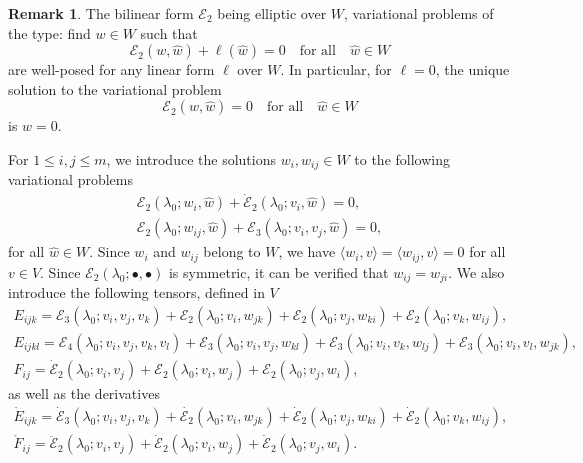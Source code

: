 \documentclass[12pt, final]{scrartcl}
\theoremstyle{definition}
\newtheorem{remark}{Remark}
\newcommand{\E}{\mathcal E}
\begin{document}
\begin{remark}
  \label{rem:20220902095055}
  The bilinear form $\E_2$ being elliptic over $W$, variational problems of the
  type: find $w \in W$ such that
  \begin{equation}
    \E_2(w, \hat{w})+\ell(\hat{w}) = 0 \quad \text{for all} \quad \hat{w} \in W
  \end{equation}
  are well-posed for any linear form $\ell$ over $W$. In particular, for
  $\ell=0$, the unique solution to the variational problem
  \begin{equation}
    \E_2(w, \hat{w}) = 0 \quad \text{for all} \quad \hat{w} \in W
  \end{equation}
  is $w = 0$.
\end{remark}

For $1 \leq i, j \leq m$, we introduce the solutions $w_i, w_{ij} \in W$ to the
following variational problems
\begin{gather}
  \label{eq:20220524134525}
  \E_2(\lambda_0; w_i, \hat{w}) + \dot{\E}_2(\lambda_0; v_i, \hat{w}) = 0,\\
  \label{eq:20220519164523}
  \E_2(\lambda_0; w_{i j}, \hat{w})+\E_3(\lambda_0; v_i, v_j, \hat{w}) = 0,
\end{gather}
for all $\hat{w} \in W$. Since $w_{i}$ and $w_{ij}$ belong to $W$, we have
$\langle w_{i}, v \rangle = \langle w_{ij}, v \rangle = 0$ for all $v \in V$. Since $\E_2(\lambda_0; \bullet,
\bullet)$ is symmetric, it can be verified that $w_{ij}=w_{ji}$. We also introduce
the following tensors, defined in $V$
\begin{gather}
  E_{ijk} = \E_3(\lambda_0; v_i, v_j, v_k) + \E_2(\lambda_0; v_i, w_{jk}) + \E_2(\lambda_0; v_j, w_{ki}) + \E_2(\lambda_0; v_k, w_{ij}),\\
  E_{ijkl} = \E_4(\lambda_0 ; v_i, v_j, v_k, v_l) + \E_3(\lambda_0 ; v_i, v_j, w_{kl}) + \E_3(\lambda_0 ; v_i, v_k, w_{lj}) + \E_3(\lambda_0 ; v_i, v_l, w_{jk}),\\
  F_{ij} = \dot{\E}_2(\lambda_0; v_i, v_j) + \E_2(\lambda_0; v_i, w_j) + \E_2(\lambda_0; v_j, w_i),
\end{gather}
as well as the derivatives
\begin{gather}
  \label{eq:20220615063626}
  \mathring{E}_{ijk} = \dot{\E}_3(\lambda_0; v_i, v_j, v_k) + \dot{\E_2}(\lambda_0; v_i, w_{jk}) + \dot{\E}_2(\lambda_0; v_j, w_{ki}) + \dot{\E}_2(\lambda_0; v_k, w_{ij}),\\
  \label{eq:20220615063633}
  \mathring{F}_{ij} = \ddot{\E}_2(\lambda_0; v_i, v_j) + \dot{\E}_2(\lambda_0; v_i, w_j) + \dot{\E}_2(\lambda_0; v_j, w_i).
\end{gather}
\end{document}
